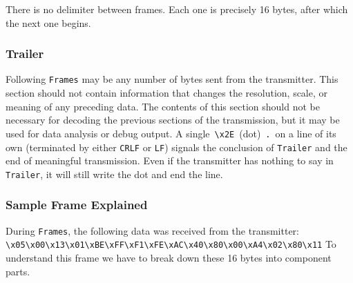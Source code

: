 \documentclass{article}
\newcommand{\oct}[1]{\texttt{\textbackslash x#1}}
\begin{document}
        \noindent There is no delimiter between frames. Each one is precisely 16 bytes, after which the next one begins.
        
        \subsubsection{Trailer}
        Following \texttt{Frames} may be any number of bytes sent from the transmitter. This section should not contain information that changes the resolution, scale, or meaning of any preceding data. The contents of this section should not be necessary for decoding the previous sections of the transmission, but it may be used for data analysis or debug output. A single~\texttt{\textbackslash x2E}~(dot)~\texttt{.}~on a line of its own (terminated by either \texttt{CRLF} or \texttt{LF}) signals the conclusion of \texttt{Trailer} and the end of meaningful transmission. Even if the transmitter has nothing to say in \texttt{Trailer}, it will still write the dot and end the line.
        
        \subsubsection{Sample Frame Explained}
            During \texttt{Frames}, the following data was received from the transmitter:\newline
            \oct{05}\oct{00}\oct{13}\oct{01}\oct{BE}\oct{FF}\oct{F1}\oct{FE}\oct{AC}\oct{40}\oct{80}\oct{00}\oct{A4}\oct{02}\oct{80}\oct{11}\newline\newline
            To understand this frame we have to break down these 16 bytes into component parts.\newline
            
\end{document}
